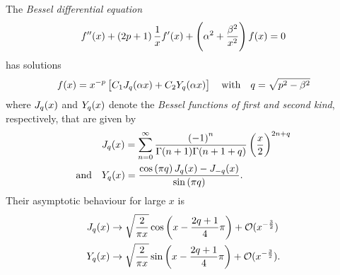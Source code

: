 The \emph{Bessel differential equation}
\begin{equation}
	f''(x) + \left(2p+1\right)\frac{1}{x} f'(x) + \left(\alpha^2 + \frac{\beta^2}{x^2}\right) f(x) = 0 \\
\end{equation}
has solutions \autocite{Bowman,Boas}
\begin{equation}
	f(x) = x^{-p} \left[C_1 J_q(\alpha x) + C_2 Y_q(\alpha x)\right] \quad \text{with} \quad q = \sqrt{p^2 - \beta^2}
\end{equation}
where \(J_q(x)\) and \(Y_q(x)\) denote the \emph{Bessel functions of first and second kind}, respectively, that are given by \autocite{Bowman,Boas}
\begin{align}
	&\besselJ_q(x) = \sum_{n=0}^{\infty} \frac{\del{-1}^n}{\Gamma(n+1)\Gamma(n+1+q)}\del{\frac{x}{2}}^{2n+q} \\
	\text{and} \quad &\besselY_q(x) = \frac{\cos\del{\pi q}\besselJ_q(x) - \besselJ_{-q}(x)}{\sin\del{\pi q}}
	\eqpunct{.}
\end{align}
Their asymptotic behaviour for large \(x\) is \autocite{Boas}
\begin{align}
	\besselJ_q(x) &\to \sqrt{\frac{2}{\pi x}} \cos\del{x-\frac{2q+1}{4}\pi} + \mathcal{O}(x^{-\frac{3}{2}}) \\
	\besselY_q(x) &\to \sqrt{\frac{2}{\pi x}} \sin\del{x-\frac{2q+1}{4}\pi} + \mathcal{O}(x^{-\frac{3}{2}})
	\eqpunct{.}
\end{align}
